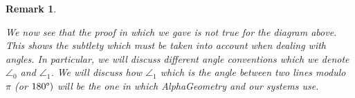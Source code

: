 \documentclass[reqno]{amsart}
\DeclareMathOperator{\1}{\textbf{1}}
\newtheorem{remark}[thm]{Remark}
\begin{document}
\begin{remark}
\begin{center}
    \end{center}
We now see that the proof in which we gave is not true for the diagram above.
This shows the subtlety which must be taken into account when dealing with
angles. In particular, we will discuss different angle conventions which we
denote $\angle_0$ and $\angle_1$. We will discuss how $\angle_1$ which is the
angle between two lines modulo $\pi$ (or $180\degree)$ will be the one in which
AlphaGeometry and our systems use.
\end{remark}
\end{document}
